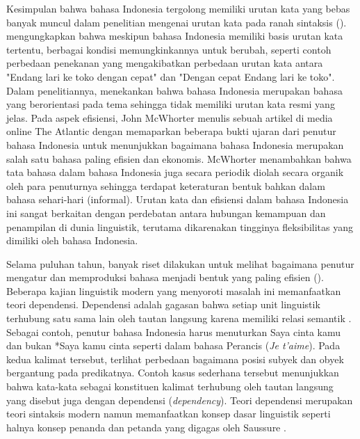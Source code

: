 Kesimpulan bahwa bahasa Indonesia tergolong memiliki urutan kata yang bebas banyak muncul dalam penelitian mengenai urutan kata pada ranah sintaksis (\citealp{stack2005word, postman2004processing}). \cite{sneddon2010indonesian} mengungkapkan bahwa meskipun bahasa Indonesia memiliki basis urutan kata tertentu, berbagai kondisi memungkinkannya untuk berubah, seperti contoh perbedaan penekanan yang mengakibatkan perbedaan urutan kata antara "Endang lari ke toko dengan cepat" dan "Dengan cepat Endang lari ke toko". Dalam penelitiannya, \cite{postman2004processing} menekankan bahwa bahasa Indonesia merupakan bahasa yang berorientasi pada tema sehingga tidak memiliki urutan kata resmi yang jelas. Pada aspek efisiensi, John McWhorter menulis sebuah artikel di media online The Atlantic \citep{mcwhorter2016efficient} dengan memaparkan beberapa bukti ujaran dari penutur bahasa Indonesia untuk menunjukkan bagaimana bahasa Indonesia merupakan salah satu bahasa paling efisien dan ekonomis. McWhorter menambahkan bahwa tata bahasa dalam bahasa Indonesia juga secara periodik diolah secara organik oleh para penuturnya sehingga terdapat keteraturan bentuk bahkan dalam bahasa sehari-hari (informal). Urutan kata dan efisiensi dalam bahasa Indonesia ini sangat berkaitan dengan perdebatan antara hubungan kemampuan dan penampilan di dunia linguistik, terutama dikarenakan tingginya fleksibilitas yang dimiliki oleh bahasa Indonesia.

Selama puluhan tahun, banyak riset dilakukan untuk melihat bagaimana penutur mengatur dan memproduksi bahasa menjadi bentuk yang paling efisien (\citealp{chomsky2005three, hawkins2004efficiency, zipf1935psycho, zipf1949human}). Beberapa kajian linguistik modern yang menyoroti masalah ini memanfaatkan teori dependensi. Dependensi adalah gagasan bahwa setiap unit linguistik terhubung satu sama lain oleh tautan langsung karena memiliki relasi semantik \citep{tesniere1959elements}. Sebagai contoh, penutur bahasa Indonesia harus menuturkan Saya cinta kamu dan bukan *Saya kamu cinta seperti dalam bahasa Perancis (\textit{Je t'aime}). Pada kedua kalimat tersebut, terlihat perbedaan bagaimana posisi subyek dan obyek bergantung pada predikatnya. Contoh kasus sederhana tersebut menunjukkan bahwa kata-kata sebagai konstituen kalimat terhubung oleh tautan langsung yang disebut juga dengan dependensi (\textit{dependency}). Teori dependensi merupakan teori sintaksis modern namun memanfaatkan konsep dasar linguistik seperti halnya konsep penanda dan petanda yang digagas oleh Saussure \citep{key2017course}. 

